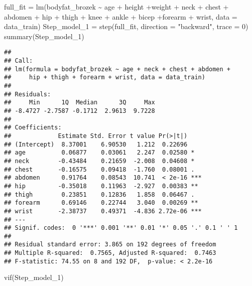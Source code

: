 \documentclass[
]{article}
\newenvironment{Shaded}{\begin{snugshade}}{\end{snugshade}}
\newcommand{\AttributeTok}[1]{\textcolor[rgb]{0.77,0.63,0.00}{#1}}
\newcommand{\DecValTok}[1]{\textcolor[rgb]{0.00,0.00,0.81}{#1}}
\newcommand{\FunctionTok}[1]{\textcolor[rgb]{0.00,0.00,0.00}{#1}}
\newcommand{\NormalTok}[1]{#1}
\newcommand{\OtherTok}[1]{\textcolor[rgb]{0.56,0.35,0.01}{#1}}
\newcommand{\SpecialCharTok}[1]{\textcolor[rgb]{0.00,0.00,0.00}{#1}}
\newcommand{\StringTok}[1]{\textcolor[rgb]{0.31,0.60,0.02}{#1}}
\begin{document}
\begin{Shaded}
\begin{Highlighting}[]
\NormalTok{full\_fit }\OtherTok{=} \FunctionTok{lm}\NormalTok{(bodyfat\_brozek }\SpecialCharTok{\textasciitilde{}}\NormalTok{ age }\SpecialCharTok{+}\NormalTok{ height }\SpecialCharTok{+}\NormalTok{weight }\SpecialCharTok{+}\NormalTok{ neck }\SpecialCharTok{+}\NormalTok{ chest }\SpecialCharTok{+}\NormalTok{ abdomen }\SpecialCharTok{+}\NormalTok{ hip }\SpecialCharTok{+}\NormalTok{ thigh }\SpecialCharTok{+}\NormalTok{ knee }\SpecialCharTok{+}\NormalTok{ ankle }\SpecialCharTok{+}\NormalTok{ bicep }\SpecialCharTok{+}\NormalTok{forearm }\SpecialCharTok{+}\NormalTok{ wrist, }\AttributeTok{data =}\NormalTok{ data\_train)}
\NormalTok{Step\_model\_1 }\OtherTok{=} \FunctionTok{step}\NormalTok{(full\_fit, }\AttributeTok{direction =} \StringTok{"backward"}\NormalTok{, }\AttributeTok{trace =} \DecValTok{0}\NormalTok{)}
\FunctionTok{summary}\NormalTok{(Step\_model\_1)}
\end{Highlighting}
\end{Shaded}

\begin{verbatim}
## 
## Call:
## lm(formula = bodyfat_brozek ~ age + neck + chest + abdomen + 
##     hip + thigh + forearm + wrist, data = data_train)
## 
## Residuals:
##     Min      1Q  Median      3Q     Max 
## -8.4727 -2.7587 -0.1712  2.9613  9.7228 
## 
## Coefficients:
##             Estimate Std. Error t value Pr(>|t|)    
## (Intercept)  8.37001    6.90530   1.212  0.22696    
## age          0.06877    0.03061   2.247  0.02580 *  
## neck        -0.43484    0.21659  -2.008  0.04608 *  
## chest       -0.16575    0.09418  -1.760  0.08001 .  
## abdomen      0.91764    0.08543  10.741  < 2e-16 ***
## hip         -0.35018    0.11963  -2.927  0.00383 ** 
## thigh        0.23851    0.12836   1.858  0.06467 .  
## forearm      0.69146    0.22744   3.040  0.00269 ** 
## wrist       -2.38737    0.49371  -4.836 2.72e-06 ***
## ---
## Signif. codes:  0 '***' 0.001 '**' 0.01 '*' 0.05 '.' 0.1 ' ' 1
## 
## Residual standard error: 3.865 on 192 degrees of freedom
## Multiple R-squared:  0.7565, Adjusted R-squared:  0.7463 
## F-statistic: 74.55 on 8 and 192 DF,  p-value: < 2.2e-16
\end{verbatim}

\begin{Shaded}
\begin{Highlighting}[]
\FunctionTok{vif}\NormalTok{(Step\_model\_1)}
\end{Highlighting}
\end{Shaded}
\end{document}
